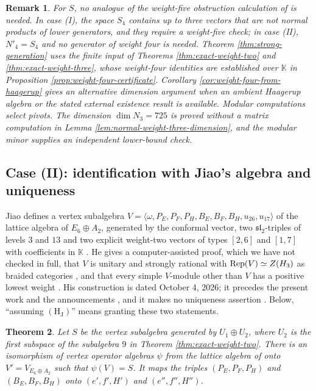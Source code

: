 \documentclass[leqno]{article}
\newcommand{\K}{\ensuremath{\mathbb{K}}}
\let\cal\relax
\newcommand{\cal}{\mathcal}
\newcommand{\la}{\langle}
\newcommand{\ra}{\rangle}
\DeclareMathOperator{\Rep}{Rep}
\newtheorem{thm}{Theorem}[section]
\newtheorem{remark}[thm]{Remark}
\numberwithin{equation}{section}
\begin{document}
\begin{remark}\normalfont
\label{rem:no-weight-five}
For $S$, no analogue of the weight-five obstruction calculation of \cite[Proposition 4.2]{Rie26b} is needed. In case (I), the space $S_4$ contains up to three vectors that are not normal products of lower generators, and they require a weight-five check; in case (II), $N'_4 = S_4$ and no generator of weight four is needed. Theorem \ref{thm:strong-generation} uses the finite input of Theorems \ref{thm:exact-weight-two} and \ref{thm:exact-weight-three}, whose weight-four identities are established over $\K$ in Proposition \ref{prop:weight-four-certificate}. Corollary \ref{cor:weight-four-from-haagerup} gives an alternative dimension argument when an ambient Haagerup algebra or the stated external existence result is available. Modular computations select pivots. The dimension $\dim N_3 = 725$ is proved without a matrix computation in Lemma \ref{lem:normal-weight-three-dimension}, and the modular minor supplies an independent lower-bound check.
\end{remark}

\subsection{Case (II): identification with Jiao's algebra and uniqueness}
\label{subsec:jiao}

Jiao \cite{Jia26} defines a vertex subalgebra $V = \la \omega, P_E, P_F, P_H, B_E, B_F, B_H, u_{26}, u_{17}\ra$ of the lattice algebra of $E_6 \oplus A_2$, generated by the conformal vector, two $\mathfrak{sl}_2$-triples of levels $3$ and $13$ and two explicit weight-two vectors of types $[2,6]$ and $[1,7]$ with coefficients in $\K$ \cite[Section 3]{Jia26}. He gives a computer-assisted proof, which we have not checked in full, that $V$ is unitary and strongly rational with $\Rep(V) \simeq Z(\cal H_3)$ as braided categories \cite[Theorem 1.1]{Jia26}, and that every simple $V$-module other than $V$ has a positive lowest weight \cite[Corollary 6.8]{Jia26}. His construction is dated October 4, 2026; it precedes the present work and the announcements \cite{Rie26,Hua26}, and it makes no uniqueness assertion \cite[Section 1.2]{Jia26}. Below, ``assuming $\mathrm{(H_J)}$'' means granting these two statements.

\begin{thm}
\label{thm:jiao-identification}
Let $S$ be the vertex subalgebra generated by $U_1 \oplus U_2$, where $U_2$ is the first subspace of the subalgebra $9$ in Theorem \ref{thm:exact-weight-two}. There is an isomorphism of vertex operator algebras $\psi$ from the lattice algebra of \cite{Jia26} onto $V' = V_{E_6 \oplus A_2}$ such that $\psi(V) = S$. It maps the triples $(P_E,P_F,P_H)$ and $(B_E,B_F,B_H)$ onto $(e',f',H')$ and $(e'',f'',H'')$.
\end{thm}
\end{document}
